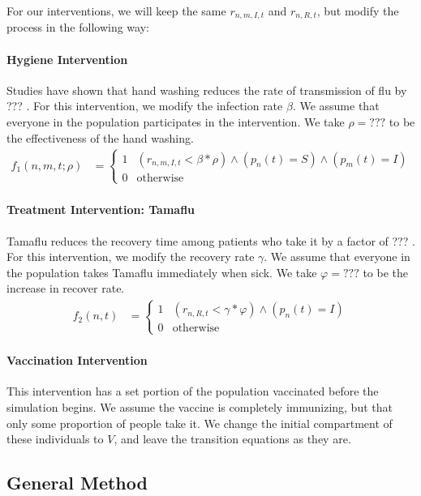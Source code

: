 \documentclass{article}
\begin{document}
For our interventions, we will keep the same $r_{n,m,I,t}$ and $r_{n,R,t}$, but modify the process in the following way:
\paragraph{Hygiene Intervention}
Studies have shown that hand washing reduces the rate of transmission of flu by ??? %
.  For this intervention, we modify the infection rate $\beta$.  We assume that everyone in the population participates in the intervention.  We take $\rho = ???$ %
to be the effectiveness of the hand washing.
\begin{align*}
   f_1(n,m,t;\rho) &= \begin{cases}
        1 & (r_{n,m,I,t} < \beta * \rho ) \wedge (p_n(t) = S) \wedge (p_m(t) = I)
     \\ 0 & \text{otherwise}
   \end{cases}
\end{align*}
\paragraph{Treatment Intervention: Tamaflu}
Tamaflu reduces the recovery time among patients who take it by a factor of ??? %
.  For this intervention, we modify the recovery rate $\gamma$.  We assume that everyone in the population takes Tamaflu immediately when sick.  We take $\varphi = ???$ %
to be the increase in recover rate.
\begin{align*}
f_2(n,t) &= \begin{cases}
        1 & (r_{n,R,t} < \gamma * \varphi) \wedge (p_n(t) = I)
     \\ 0 & \text{otherwise}
   \end{cases}
\end{align*}
\paragraph{Vaccination Intervention}
This intervention has a set portion of the population vaccinated before the simulation begins.  We assume the vaccine is completely immunizing, but that only some proportion of people take it.  We change the initial compartment of these individuals to $V$, and leave the transition equations as they are.

\subsection*{General Method}
\end{document}
